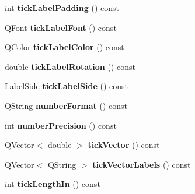 \begin{DoxyCompactItemize}
\item 
int {\bfseries tick\+Label\+Padding} () const \hypertarget{classQCPAxis_af7bc2fac3f95949ecd0204d20dc1463b}{}\label{classQCPAxis_af7bc2fac3f95949ecd0204d20dc1463b}

\item 
Q\+Font {\bfseries tick\+Label\+Font} () const \hypertarget{classQCPAxis_af6d7ad17f3398b114a413f7a3dc5ef9d}{}\label{classQCPAxis_af6d7ad17f3398b114a413f7a3dc5ef9d}

\item 
Q\+Color {\bfseries tick\+Label\+Color} () const \hypertarget{classQCPAxis_ac86d0636aa55ddd94df171f609897a32}{}\label{classQCPAxis_ac86d0636aa55ddd94df171f609897a32}

\item 
double {\bfseries tick\+Label\+Rotation} () const \hypertarget{classQCPAxis_ab9199d72b8c4c06cc6c9b928c30d00d2}{}\label{classQCPAxis_ab9199d72b8c4c06cc6c9b928c30d00d2}

\item 
\hyperlink{classQCPAxis_a24b13374b9b8f75f47eed2ea78c37db9}{Label\+Side} {\bfseries tick\+Label\+Side} () const \hypertarget{classQCPAxis_a0a33835705406506b02a445b1ba32357}{}\label{classQCPAxis_a0a33835705406506b02a445b1ba32357}

\item 
Q\+String {\bfseries number\+Format} () const \hypertarget{classQCPAxis_ae6729b40845b29ffa5a440aa53cec215}{}\label{classQCPAxis_ae6729b40845b29ffa5a440aa53cec215}

\item 
int {\bfseries number\+Precision} () const \hypertarget{classQCPAxis_a91cb2825060ac79a889296377fe0c7c1}{}\label{classQCPAxis_a91cb2825060ac79a889296377fe0c7c1}

\item 
Q\+Vector$<$ double $>$ {\bfseries tick\+Vector} () const \hypertarget{classQCPAxis_a5b00b14f480f926df976cc6c52309e78}{}\label{classQCPAxis_a5b00b14f480f926df976cc6c52309e78}

\item 
Q\+Vector$<$ Q\+String $>$ {\bfseries tick\+Vector\+Labels} () const \hypertarget{classQCPAxis_a64e6fa81f943ad33dcaf3fa606687b93}{}\label{classQCPAxis_a64e6fa81f943ad33dcaf3fa606687b93}

\item 
int {\bfseries tick\+Length\+In} () const \hypertarget{classQCPAxis_a59265d65c5034695ac2578bccbbb0f4a}{}\label{classQCPAxis_a59265d65c5034695ac2578bccbbb0f4a}


\end{DoxyCompactItemize}
